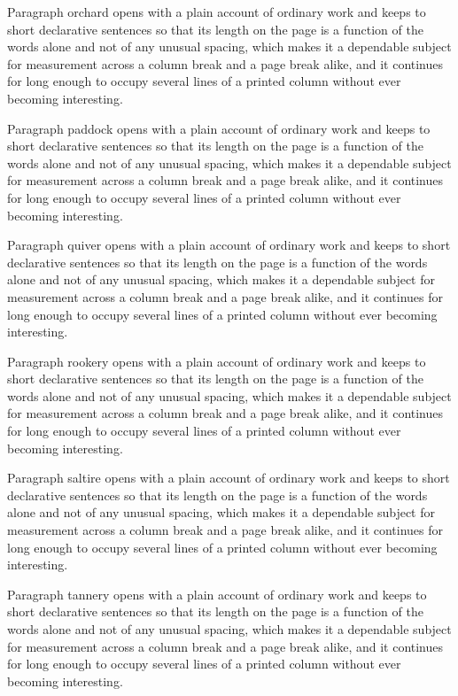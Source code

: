 \documentclass{article}
\begin{document}
Paragraph orchard opens with a plain account of ordinary work and keeps to short declarative sentences so that its length on the page is a function of the words alone and not of any unusual spacing, which makes it a dependable subject for measurement across a column break and a page break alike, and it continues for long enough to occupy several lines of a printed column without ever becoming interesting.

Paragraph paddock opens with a plain account of ordinary work and keeps to short declarative sentences so that its length on the page is a function of the words alone and not of any unusual spacing, which makes it a dependable subject for measurement across a column break and a page break alike, and it continues for long enough to occupy several lines of a printed column without ever becoming interesting.

Paragraph quiver opens with a plain account of ordinary work and keeps to short declarative sentences so that its length on the page is a function of the words alone and not of any unusual spacing, which makes it a dependable subject for measurement across a column break and a page break alike, and it continues for long enough to occupy several lines of a printed column without ever becoming interesting.

Paragraph rookery opens with a plain account of ordinary work and keeps to short declarative sentences so that its length on the page is a function of the words alone and not of any unusual spacing, which makes it a dependable subject for measurement across a column break and a page break alike, and it continues for long enough to occupy several lines of a printed column without ever becoming interesting.

Paragraph saltire opens with a plain account of ordinary work and keeps to short declarative sentences so that its length on the page is a function of the words alone and not of any unusual spacing, which makes it a dependable subject for measurement across a column break and a page break alike, and it continues for long enough to occupy several lines of a printed column without ever becoming interesting.

Paragraph tannery opens with a plain account of ordinary work and keeps to short declarative sentences so that its length on the page is a function of the words alone and not of any unusual spacing, which makes it a dependable subject for measurement across a column break and a page break alike, and it continues for long enough to occupy several lines of a printed column without ever becoming interesting.
\end{document}
